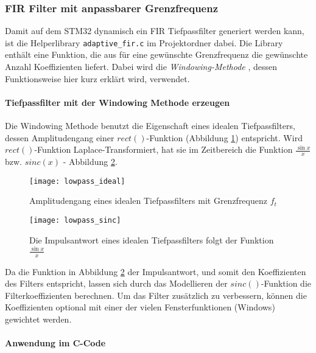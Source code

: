 \subsubsection{FIR Filter mit anpassbarer Grenzfrequenz}
\label{sec:LibFIRAdaptive}

Damit auf dem STM32 dynamisch ein FIR Tiefpassfilter generiert werden kann, ist die Helperlibrary \texttt{adaptive\_fir.c} im Projektordner dabei.
Die Library enthält eine Funktion, die aus für eine gewünschte Grenzfrequenz die gewünschte Anzahl Koeffizienten liefert.
Dabei wird die \textit{Windowing-Methode} \cite{FIR-Windowing}, dessen Funktionsweise hier kurz erklärt wird, verwendet.

\paragraph{Tiefpassfilter mit der Windowing Methode erzeugen}

Die Windowing Methode benutzt die Eigenschaft eines idealen Tiefpassfilters, dessen Amplitudengang einer $rect()$-Funktion (Abbildung \ref{pic:lowpass_ideal}) entspricht.
Wird $rect()$-Funktion Laplace-Transformiert, hat sie im Zeitbereich die Funktion $\frac{\sin{x}}{x}$ bzw. $sinc(x)$ - Abbildung \ref{pic:lowpass_sinc}.

\begin{figure}[H]
	\centering
	\texttt{[image: lowpass\_ideal]}
	\caption{Amplitudengang eines idealen Tiefpassfilters mit Grenzfrequenz $f_t$ \cite{FIR-Windowing}}
	\label{pic:lowpass_ideal}
\end{figure}

\begin{figure}[H]
	\centering
	\texttt{[image: lowpass\_sinc]}
	\caption{Die Impulsantwort eines idealen Tiefpassfilters folgt der Funktion $\frac{\sin{x}}{x}$ \cite{FIR-Windowing}}
	\label{pic:lowpass_sinc}
\end{figure}

Da die Funktion in Abbildung \ref{pic:lowpass_sinc} der Impulsantwort, und somit den Koeffizienten des Filters entspricht, lassen sich durch das Modellieren der $sinc()$-Funktion die Filterkoeffizienten berechnen.
Um das Filter zusätzlich zu verbessern, können die Koeffizienten optional mit einer der vielen Fensterfunktionen (Windows) gewichtet werden.

\paragraph{Anwendung im C-Code}

